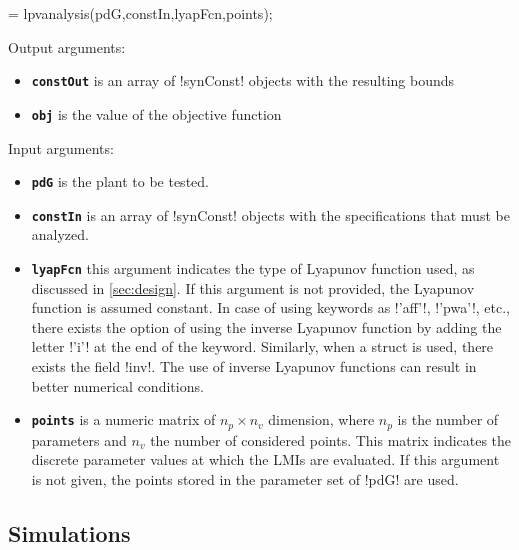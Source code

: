 \documentclass[fleqn,11pt]{article}
\newcommand{\lcode}[1]{\textbf{%
    \lstinline[style=mystyle]{#1}}}
\begin{document}
\begin{code}
 = lpvanalysis(pdG,constIn,lyapFcn,points);
\end{code}
Output arguments:
\begin{itemize}
  \item \lcode{constOut} is an array of !synConst! objects with the resulting bounds
  \item \lcode{obj} is the value of the objective function
\end{itemize}
Input arguments:
\begin{itemize}
  \item \lcode{pdG} is the plant to be tested.
  \item \lcode{constIn} is an array of !synConst! objects with the specifications that must be analyzed.
  \item \lcode{lyapFcn} this argument indicates the type of Lyapunov function used, as discussed in \cref{sec:design}. If this argument is not provided, the Lyapunov function is assumed constant. In case of using keywords as !'aff'!, !'pwa'!, etc., there exists the option of using the inverse Lyapunov function by adding the letter !'i'! at the end of the keyword. Similarly, when a struct is used, there exists the field !inv!. The use of inverse Lyapunov functions can result in better numerical conditions.
  \item \lcode{points} is a numeric matrix of $n_p\times n_v$ dimension, where $n_p$ is the number of parameters and $n_v$ the number of considered points. This matrix indicates the discrete parameter values at which the LMIs are evaluated. If this argument is not given, the points stored in the parameter set of !pdG! are used.
\end{itemize}


\subsection{Simulations}
\end{document}
